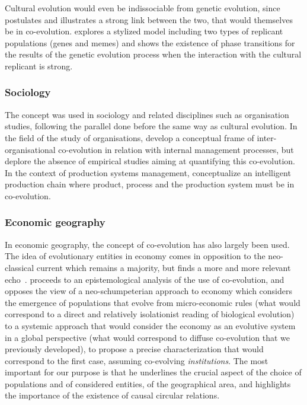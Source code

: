 \documentclass[letterpaper]{article}
\begin{document}
Cultural evolution would even be indissociable from genetic evolution, since \cite{durham1991coevolution} postulates and illustrates a strong link between the two, that would themselves be in co-evolution. \cite{bull2000meme} explores a stylized model including two types of replicant populations (genes and memes) and shows the existence of phase transitions for the results of the genetic evolution process when the interaction with the cultural replicant is strong.


\subsubsection{Sociology}

The concept was used in sociology and related disciplines such as organisation studies, following the parallel done before the same way as cultural evolution. In the field of the study of organisations, \cite{volberda2003co} develop a conceptual frame of inter-organisational co-evolution in relation with internal management processes, but deplore the absence of empirical studies aiming at quantifying this co-evolution. In the context of production systems management, \cite{tolio2010species} conceptualize an intelligent production chain where product, process and the production system must be in co-evolution.


\subsubsection{Economic geography}

In economic geography, the concept of co-evolution has also largely been used. The idea of evolutionary entities in economy comes in opposition to the neo-classical current which remains a majority, but finds a more and more relevant echo~\cite{nelson2009evolutionary}. \cite{schamp201020} proceeds to an epistemological analysis of the use of co-evolution, and opposes the view of a neo-schumpeterian approach to economy which considers the emergence of populations that evolve from micro-economic rules (what would correspond to a direct and relatively isolationist reading of biological evolution) to a systemic approach that would consider the economy as an evolutive system in a global perspective (what would correspond to diffuse co-evolution that we previously developed), to propose a precise characterization that would correspond to the first case, assuming co-evolving \emph{institutions}. The most important for our purpose is that he underlines the crucial aspect of the choice of populations and of considered entities, of the geographical area, and highlights the importance of the existence of causal circular relations.
\end{document}
